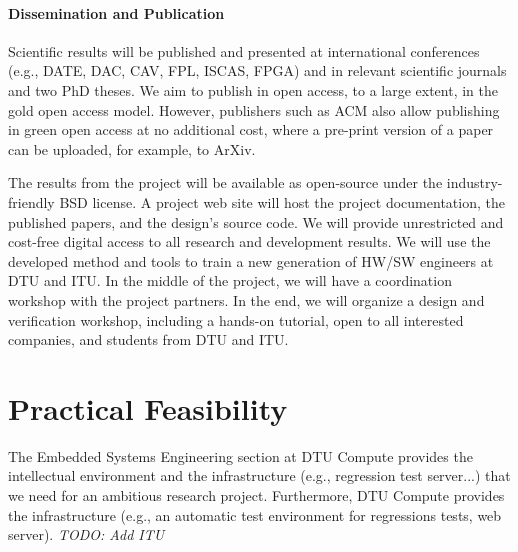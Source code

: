 \documentclass[fleqn,12pt]{article}
\newcommand{\todo}[1]{{\it TODO: #1}}
\begin{document}
\paragraph*{Dissemination and Publication}

Scientific results will be published and presented at international
conferences (e.g., DATE, DAC, CAV, FPL, ISCAS, FPGA) and in relevant scientific journals
and two PhD theses.
We aim to publish in open access, to a large extent, in the gold open access model.
However, publishers such as ACM also allow publishing in green open access
at no additional cost, where a pre-print version of a paper can be uploaded,
for example, to ArXiv.

The results from the project will be available as open-source under the
industry-friendly BSD license.
A project web site will host the project documentation, the published papers, and the design's source code.
We will provide unrestricted and cost-free digital access to all research and development results.
%
We will use the developed method and tools to train a new generation of HW/SW engineers
at DTU and ITU.
In the middle of the project, we will have a coordination workshop with the project partners.
In the end, we will organize a design and verification workshop, including a hands-on tutorial,
open to all interested companies, and students from DTU and ITU.

\section{Practical Feasibility}

The Embedded Systems Engineering section at DTU Compute provides
the intellectual environment and the infrastructure (e.g., regression test server...) that we need for an ambitious research project.
Furthermore, DTU Compute provides the infrastructure (e.g., an automatic test
environment for regressions tests, web server).
\todo{Add ITU}

%
\end{document}
